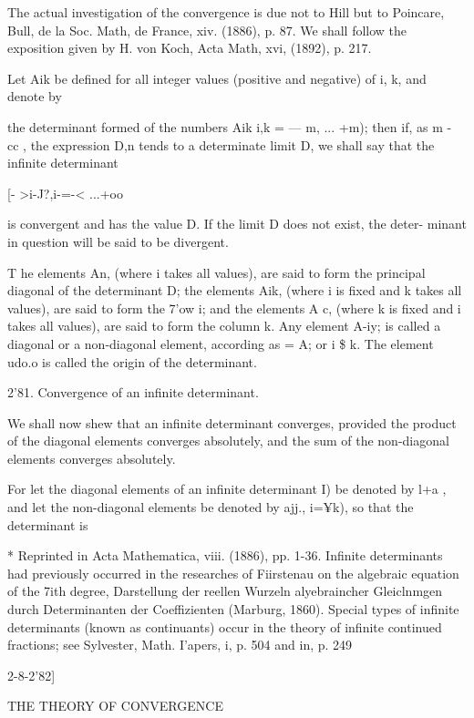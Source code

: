 The actual investigation of the convergence is due not to Hill but to
Poincare, Bull, de la Soc. Math, de France, xiv. (1886), p. 87. We
shall follow the exposition given by H. von Koch, Acta Math, xvi,
(1892), p. 217.

Let Aik be defined for all integer values (positive and negative) of
i, k, and denote by

the determinant formed of the numbers Aik i,k = — m, ... +m); then if,
as m - cc , the expression D,n tends to a determinate limit D, we
shall say that the infinite determinant

[- >i-J?,i-=-< ...+oo

is convergent and has the value D. If the limit D does not exist, the
deter- minant in question will be said to be divergent.

T he elements An, (where i takes all values), are said to form the
principal diagonal of the determinant D; the elements Aik, (where i is
fixed and k takes all values), are said to form the 7'ow i; and the
elements A c, (where k is fixed and i takes all values), are said to
form the column k. Any element A-iy; is called a diagonal or a
non-diagonal element, according as = A; or i \$ k. The element udo.o
is called the origin of the determinant.

2'81. Convergence of an infinite determinant.

We shall now shew that an infinite determinant converges, provided the
product of the diagonal elements converges absolutely, and the sum of
the non-diagonal elements converges absolutely.

For let the diagonal elements of an infinite determinant I) be denoted
by l+a , and let the non-diagonal elements be denoted by ajj., i=¥k),
so that the determinant is

* Reprinted in Acta Mathematica, viii. (1886), pp. 1-36. Infinite
determinants had previously occurred in the researches of Fiirstenau
on the algebraic equation of the 7ith degree, Darstellung der reellen
Wurzeln alyebraincher Gleiclnmgen durch Determinanten der
Coeffizienten (Marburg, 1860). Special types of infinite determinants
(known as continuants) occur in the theory of infinite continued
fractions; see Sylvester, Math. I'apers, i, p. 504 and in, p. 249



2-8-2'82]



THE THEORY OF CONVERGENCE



